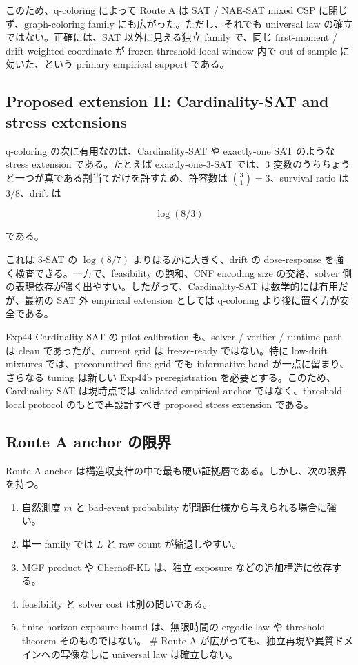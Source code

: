 \documentclass[12pt,a4paper]{article}
\begin{document}
このため、q-coloring によって Route A は SAT / NAE-SAT mixed CSP に閉じず、graph-coloring family にも広がった。ただし、それでも universal law の確立ではない。正確には、SAT 以外に見える独立 family で、同じ first-moment / drift-weighted coordinate が frozen threshold-local window 内で out-of-sample に効いた、という primary empirical support である。

\subsection{Proposed extension II: Cardinality-SAT and stress extensions}\label{proposed-extension-ii-cardinality-sat-and-stress-extensions}

q-coloring の次に有用なのは、Cardinality-SAT や exactly-one SAT のような stress extension である。たとえば exactly-one-3-SAT では、3 変数のうちちょうど一つが真である割当てだけを許すため、許容数は \(\binom{3}{1}=3\)、survival ratio は \(3/8\)、drift は

\[
\log(8/3)
\]

である。

これは 3-SAT の \(\log(8/7)\) よりはるかに大きく、drift の dose-response を強く検査できる。一方で、feasibility の飽和、CNF encoding size の交絡、solver 側の表現依存が強く出やすい。したがって、Cardinality-SAT は数学的には有用だが、最初の SAT 外 empirical extension としては q-coloring より後に置く方が安全である。

Exp44 Cardinality-SAT の pilot calibration も、solver / verifier / runtime path は clean であったが、current grid は freeze-ready ではない。特に low-drift mixtures では、precommitted fine grid でも informative band が一点に留まり、さらなる tuning は新しい Exp44b preregistration を必要とする。このため、Cardinality-SAT は現時点では validated empirical anchor ではなく、threshold-local protocol のもとで再設計すべき proposed stress extension である。

\subsection{Route A anchor の限界}\label{route-a-anchor-ux306eux9650ux754c}

Route A anchor は構造収支律の中で最も硬い証拠層である。しかし、次の限界を持つ。

\begin{enumerate}
\def\labelenumi{\arabic{enumi}.}
\tightlist
\item
  自然測度 \(m\) と bad-event probability が問題仕様から与えられる場合に強い。
\item
  単一 family では \(L\) と raw count が縮退しやすい。
\item
  MGF product や Chernoff-KL は、独立 exposure などの追加構造に依存する。
\item
  feasibility と solver cost は別の問いである。
\item
  finite-horizon exposure bound は、無限時間の ergodic law や threshold theorem そのものではない。 \# Route A が広がっても、独立再現や異質ドメインへの写像なしに universal law は確立しない。
\end{enumerate}
\end{document}
